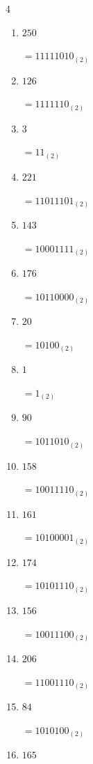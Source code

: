 \begin{multicols}{4}
\begin{enumerate}
        $=1100110_{(2)}$

  \item $250$

        $=11111010_{(2)}$

  \item $126$

        $=1111110_{(2)}$

  \item $3$

        $=11_{(2)}$

  \item $221$

        $=11011101_{(2)}$

\columnbreak %

  \item $143$

        $=10001111_{(2)}$

  \item $176$

        $=10110000_{(2)}$

  \item $20$

        $=10100_{(2)}$

  \item $1$

        $=1_{(2)}$

  \item $90$

        $=1011010_{(2)}$

  \item $158$

        $=10011110_{(2)}$

  \item $161$

        $=10100001_{(2)}$

  \item $174$

        $=10101110_{(2)}$

  \item $156$

        $=10011100_{(2)}$

  \item $206$

        $=11001110_{(2)}$

  \item $84$

        $=1010100_{(2)}$

  \item $165$


\end{enumerate}
\end{multicols}
